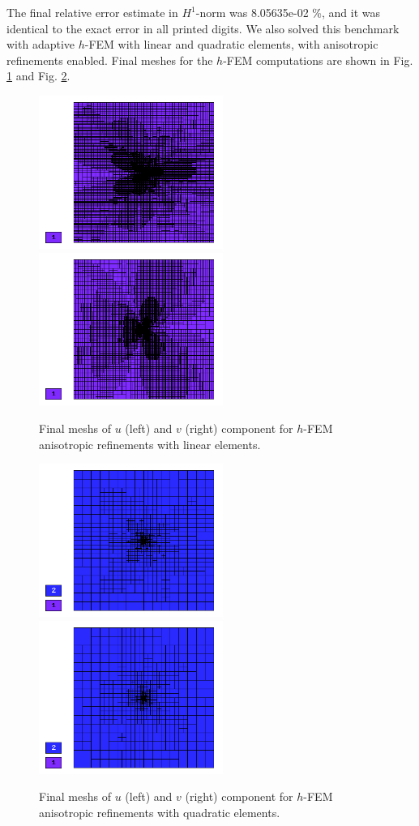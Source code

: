 \documentclass[12pt]{elsarticle}
\begin{document}
The final relative error estimate in $H^1$-norm was 8.05635e-02 \%,
and it was identical to the exact error in all printed digits.
We also solved this benchmark with adaptive $h$-FEM
with linear and quadratic elements, with anisotropic refinements enabled.
Final meshes for the $h$-FEM computations are shown
in Fig. \ref{fig:nist-3-h1-aniso} and Fig. \ref{fig:nist-3-h2-aniso}.

\begin{figure}[!ht]
\centering
\includegraphics[height=5cm]{nist/nist-3/mesh_u_h1_aniso.png}\ \
\includegraphics[height=5cm]{nist/nist-3/mesh_v_h1_aniso.png}
\caption{Final meshs of $u$ (left) and $v$ (right) component for $h$-FEM anisotropic refinements with linear elements.}
\label{fig:nist-3-h1-aniso}
\end{figure}

\begin{figure}[!ht]
\centering
\includegraphics[height=5cm]{nist/nist-3/mesh_u_h2_aniso.png}\ \
\includegraphics[height=5cm]{nist/nist-3/mesh_v_h2_aniso.png}
\caption{Final meshs of $u$ (left) and $v$ (right) component for $h$-FEM anisotropic refinements with quadratic elements.}
\label{fig:nist-3-h2-aniso}
\end{figure}
\end{document}
